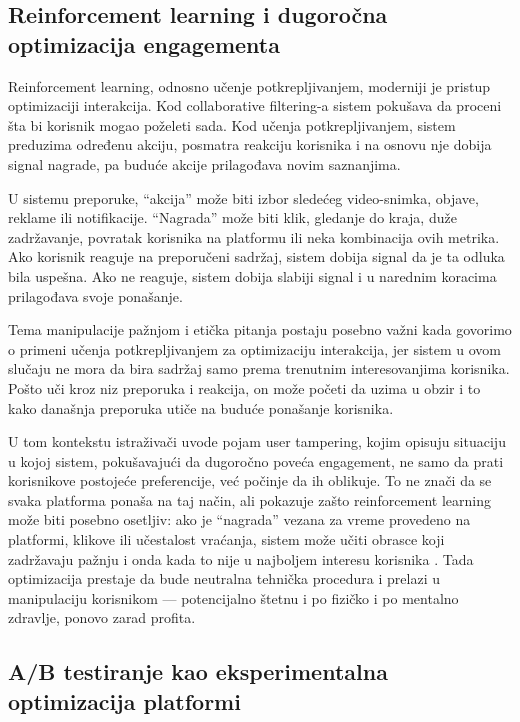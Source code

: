 \subsection{Reinforcement learning i dugoročna optimizacija engagementa}

Reinforcement learning, odnosno učenje potkrepljivanjem, moderniji je pristup optimizaciji interakcija. Kod collaborative filtering-a sistem pokušava da proceni šta bi korisnik mogao poželeti sada. Kod učenja potkrepljivanjem, sistem preduzima određenu akciju, posmatra reakciju korisnika i na osnovu nje dobija signal nagrade, pa buduće akcije prilagođava novim saznanjima.

U sistemu preporuke, “akcija” može biti izbor sledećeg video-snimka, objave, reklame ili notifikacije. “Nagrada” može biti klik, gledanje do kraja, duže zadržavanje, povratak korisnika na platformu ili neka kombinacija ovih metrika. Ako korisnik reaguje na preporučeni sadržaj, sistem dobija signal da je ta odluka bila uspešna. Ako ne reaguje, sistem dobija slabiji signal i u narednim koracima prilagođava svoje ponašanje.

Tema manipulacije pažnjom i etička pitanja postaju posebno važni kada govorimo o primeni učenja potkrepljivanjem za optimizaciju interakcija, jer sistem u ovom slučaju ne mora da bira sadržaj samo prema trenutnim interesovanjima korisnika. Pošto uči kroz niz preporuka i reakcija, on može početi da uzima u obzir i to kako današnja preporuka utiče na buduće ponašanje korisnika.

U tom kontekstu istraživači uvode pojam user tampering, kojim opisuju situaciju u kojoj sistem, pokušavajući da dugoročno poveća engagement, ne samo da prati korisnikove postojeće preferencije, već počinje da ih oblikuje. To ne znači da se svaka platforma ponaša na taj način, ali pokazuje zašto reinforcement learning može biti posebno osetljiv: ako je “nagrada” vezana za vreme provedeno na platformi, klikove ili učestalost vraćanja, sistem može učiti obrasce koji zadržavaju pažnju i onda kada to nije u najboljem interesu korisnika \cite{kasirzadeh2021user}. Tada optimizacija prestaje da bude neutralna tehnička procedura i prelazi u manipulaciju korisnikom — potencijalno štetnu i po fizičko i po mentalno zdravlje, ponovo zarad profita.

\subsection{A/B testiranje kao eksperimentalna optimizacija platformi}

